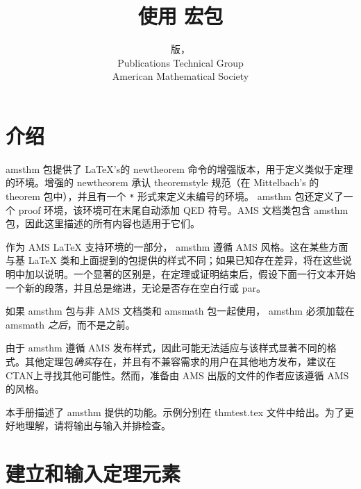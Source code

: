 \documentclass{article}
\title{使用 \pkg{amsthm} 宏包}
\author{\instrversion{} 版，\instrdate\\[.5ex]
 Publications Technical Group\\American Mathematical Society}
\date{}
\newcommand{\ntt}{%
  \fontfamily\ttdefault \fontseries\mddefault \fontshape\updefault
  \selectfont
}
\DeclareRobustCommand{\cn}[1]{{\ntt\bslchar#1}}
\DeclareRobustCommand{\pkg}[1]{{\ntt#1}}
\DeclareRobustCommand{\env}[1]{{\ntt#1}}
\DeclareRobustCommand{\fn}[1]{{\ntt#1}}
\def\latex/{{\protect\LaTeX}}
\begin{document}
\maketitle

\begingroup
\small
\tableofcontents
\endgroup


\newpage %

\section{介绍}

\begin{sloppypar}
\pkg{amsthm} 包提供了 \latex/'s的 \cn{newtheorem} 命令的增强版本，用于定义类似于定理的环境。增强的 \cn{newtheorem} 承认 \cn{theoremstyle} 规范（在 Mittelbach's 的 \pkg{theorem} 包中），并且有一个 \verb+*+ 形式来定义未编号的环境。\pkg{amsthm} 包还定义了一个 \env{proof} 环境，该环境可在末尾自动添加 QED 符号。AMS 文档类包含 \pkg{amsthm} 包，因此这里描述的所有内容也适用于它们。
\end{sloppypar}

作为 AMS \latex/ 支持环境的一部分，\pkg{amsthm} 遵循 AMS 风格。这在某些方面与基 \latex/ 类和上面提到的包提供的样式不同；如果已知存在差异，将在这些说明中加以说明。一个显著的区别是，在定理或证明结束后，假设下面一行文本开始一个新的段落，并且总是缩进，无论是否存在空白行或 \cn{par}。

如果 \pkg{amsthm} 包与非 AMS 文档类和 \pkg{amsmath} 包一起使用，\pkg{amsthm} 必须加载在 \pkg{amsmath} \emph{之后}，而不是之前。

由于 \pkg{amsthm} 遵循 AMS 发布样式，因此可能无法适应与该样式显著不同的格式。其他定理包\emph{确实}存在，并且有不兼容需求的用户在其他地方发布，建议在 CTAN\@ 上寻找其他可能性。然而，准备由 AMS 出版的文件的作者应该遵循 AMS 的风格。

本手册描述了 \pkg{amsthm} 提供的功能。示例分别在 \fn{thmtest.tex} 文件中给出。为了更好地理解，请将输出与输入并排检查。


\section{建立和输入定理元素}
\end{document}
